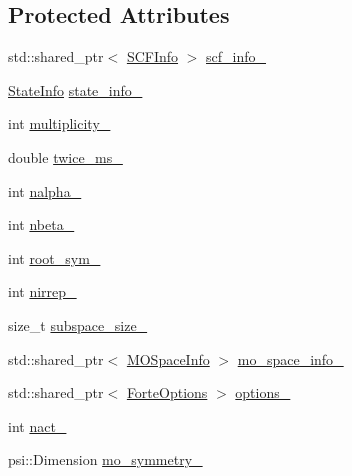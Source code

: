 \subsection*{Protected Attributes}
\begin{DoxyCompactItemize}
\item 
std\+::shared\+\_\+ptr$<$ \mbox{\hyperlink{classforte_1_1_s_c_f_info}{S\+C\+F\+Info}} $>$ \mbox{\hyperlink{classforte_1_1_c_i___reference_a0144cae57432001b7c1e8af7cb6fe35b}{scf\+\_\+info\+\_\+}}
\item 
\mbox{\hyperlink{classforte_1_1_state_info}{State\+Info}} \mbox{\hyperlink{classforte_1_1_c_i___reference_a4848e63165a294524d5321dda65a6ea7}{state\+\_\+info\+\_\+}}
\item 
int \mbox{\hyperlink{classforte_1_1_c_i___reference_a13a156cbd1ddf25e4c29d9fda7acaf01}{multiplicity\+\_\+}}
\item 
double \mbox{\hyperlink{classforte_1_1_c_i___reference_a4a545fae5773bd93e5fb55bdd95303a9}{twice\+\_\+ms\+\_\+}}
\item 
int \mbox{\hyperlink{classforte_1_1_c_i___reference_a40d9896c512347743a0473c52dab1a20}{nalpha\+\_\+}}
\item 
int \mbox{\hyperlink{classforte_1_1_c_i___reference_aca9587b2bc5ae8865d2b5eb8b063bbb3}{nbeta\+\_\+}}
\item 
int \mbox{\hyperlink{classforte_1_1_c_i___reference_ab72b053394477b8da8a30987f747a8aa}{root\+\_\+sym\+\_\+}}
\item 
int \mbox{\hyperlink{classforte_1_1_c_i___reference_a987c8c47ac57e18691a4784c444cd4ee}{nirrep\+\_\+}}
\item 
size\+\_\+t \mbox{\hyperlink{classforte_1_1_c_i___reference_a360fd8b4c4a9ebefdcba1ff5b75173c5}{subspace\+\_\+size\+\_\+}}
\item 
std\+::shared\+\_\+ptr$<$ \mbox{\hyperlink{classforte_1_1_m_o_space_info}{M\+O\+Space\+Info}} $>$ \mbox{\hyperlink{classforte_1_1_c_i___reference_a45d8ef20fc583659241f93ab2c6a0316}{mo\+\_\+space\+\_\+info\+\_\+}}
\item 
std\+::shared\+\_\+ptr$<$ \mbox{\hyperlink{classforte_1_1_forte_options}{Forte\+Options}} $>$ \mbox{\hyperlink{classforte_1_1_c_i___reference_adff8bf78314c834aaad6660576997fc4}{options\+\_\+}}
\item 
int \mbox{\hyperlink{classforte_1_1_c_i___reference_afe5680a4c91723e6ccdd2396e5633a73}{nact\+\_\+}}
\item 
psi\+::\+Dimension \mbox{\hyperlink{classforte_1_1_c_i___reference_a519ea71e21ff54f68991d70a89e5dcb5}{mo\+\_\+symmetry\+\_\+}}

\end{DoxyCompactItemize}
